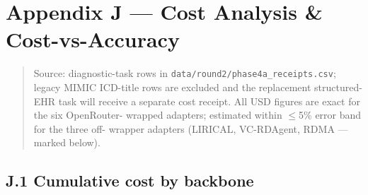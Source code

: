 \section{Appendix J --- Cost Analysis \& Cost-vs-Accuracy}\label{appendix-j-cost-analysis-cost-vs-accuracy}

\begin{quote}
Source: diagnostic-task rows in \texttt{data/round2/phase4a\_receipts.csv};
legacy MIMIC ICD-title rows are excluded and the replacement
structured-EHR task will receive a separate cost receipt.
All USD figures are exact for the six OpenRouter-
wrapped adapters; estimated within \ensuremath{\leq}5\% error band for the three off-
wrapper adapters (LIRICAL, VC-RDAgent, RDMA --- marked \texttt{\dag{}} below).
\end{quote}

\subsection{J.1 Cumulative cost by backbone}\label{j.1-cumulative-cost-by-backbone}

